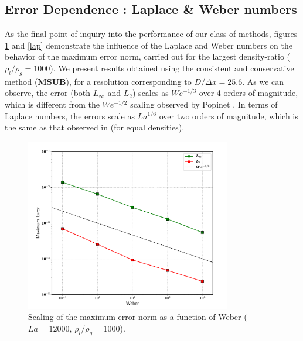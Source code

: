\subsection*{Error Dependence : Laplace \& Weber numbers}

As the final point of inquiry into the performance of our class of methods, figures \ref{web} and \ref{lap} demonstrate the influence of the Laplace and Weber numbers on the behavior of the maximum error norm, carried out for the largest density-ratio ($\rho_l/\rho_g = 1000$). We present results obtained using the consistent and conservative method (\textbf{MSUB}), for a resolution corresponding to $D / \Delta x = 25.6$. As we can observe, the error (both $L_\infty$ and $L_2$) scales as $We^{-1/3}$ over 4 orders of magnitude, which is different from the $We^{-1/2}$ scaling observed by Popinet \cite{popinet2009accurate} . In terms of Laplace numbers, the errors scale as $La^{1/6}$ over two orders of magnitude, which is the same as that observed in \cite{popinet2009accurate} (for equal densities).

\begin{figure}
    \centering
    \includegraphics[width = 0.8\textwidth]{plots/droplet_advect/webers.pdf}
\caption{ Scaling of the maximum error norm as a function of Weber ($La = 12000$, $\rho_l / \rho_g = 1000$). }
    \label{web}
\end{figure}

